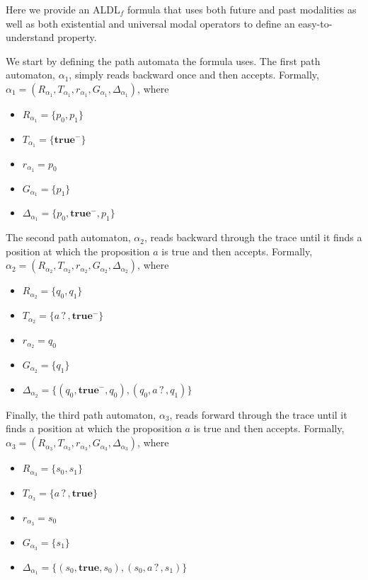 \documentclass[10pt,a4paper]{amsart}
\theoremstyle{plain}
\theoremstyle{definition}
\theoremstyle{definition}
\DeclareMathOperator{\?}{?}
\begin{document}
Here we provide an ALDL$_f$ formula that uses both future and past modalities as well as both existential and universal modal operators to define an easy-to-understand property.

We start by defining the path automata the formula uses. The first path automaton, $\alpha_1$, simply reads backward once and then accepts. Formally, $\alpha_1 = (R_{\alpha_1}, T_{\alpha_1}, r_{\alpha_1}, G_{\alpha_1}, \Delta_{\alpha_1})$, where


\begin{itemize}
  \item $R_{\alpha_1} = \{ p_0, p_1 \}$
  \item $T_{\alpha_1} = \{ \textbf{true}^- \}$
  \item $r_{\alpha_1} = p_0$
  \item $G_{\alpha_1} = \{ p_1  \}$
  \item $\Delta_{\alpha_1} = \{ p_0, \textbf{true}^-, p_1 \}$
\end{itemize}


The second path automaton, $\alpha_2$, reads backward through the trace until it finds a position at which the proposition $a$ is true and then accepts. Formally, $\alpha_2 = (R_{\alpha_2}, T_{\alpha_2}, r_{\alpha_2}, G_{\alpha_2}, \Delta_{\alpha_2})$, where

\begin{itemize}
  \item $R_{\alpha_2} = \{ q_0, q_1 \}$
  \item $T_{\alpha_2} = \{ a\?, \textbf{true}^- \}$
  \item $r_{\alpha_2} = q_0$
  \item $G_{\alpha_2} = \{ q_1 \}$
  \item $\Delta_{\alpha_2} = \{ (q_0, \textbf{true}^-, q_0), (q_0, a\?, q_1) \}$
\end{itemize}

Finally, the third path automaton, $\alpha_3$, reads forward through the trace until it finds a position at which the proposition $a$ is true and then accepts. Formally, $\alpha_3 = (R_{\alpha_3}, T_{\alpha_3}, r_{\alpha_3}, G_{\alpha_3}, \allowbreak\Delta_{\alpha_3})$, where


\begin{itemize}
  \item $R_{\alpha_3} = \{ s_0, s_1 \}$
  \item $T_{\alpha_3} = \{ a\?, \textbf{true} \}$
  \item $r_{\alpha_3} = s_0$
  \item $G_{\alpha_3} = \{ s_1 \}$
  \item $\Delta_{\alpha_1} = \{ (s_0, \textbf{true}, s_0), (s_0, a\?, s_1) \}$
\end{itemize}
\end{document}
